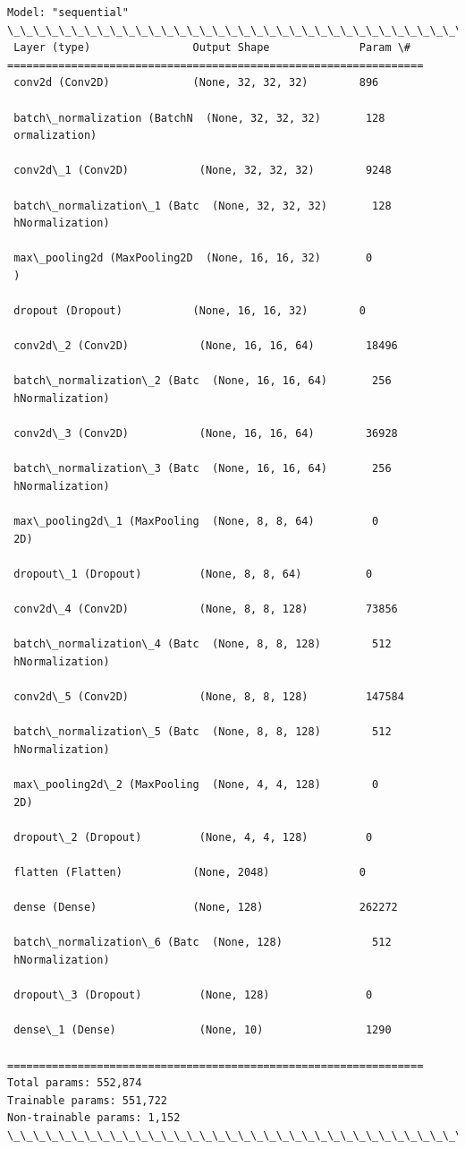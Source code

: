 \documentclass[11pt]{article}
\begin{document}
    \begin{Verbatim}[commandchars=\\\{\}]
Model: "sequential"
\_\_\_\_\_\_\_\_\_\_\_\_\_\_\_\_\_\_\_\_\_\_\_\_\_\_\_\_\_\_\_\_\_\_\_\_\_\_\_\_\_\_\_\_\_\_\_\_\_\_\_\_\_\_\_\_\_\_\_\_\_\_\_\_\_
 Layer (type)                Output Shape              Param \#
=================================================================
 conv2d (Conv2D)             (None, 32, 32, 32)        896

 batch\_normalization (BatchN  (None, 32, 32, 32)       128
 ormalization)

 conv2d\_1 (Conv2D)           (None, 32, 32, 32)        9248

 batch\_normalization\_1 (Batc  (None, 32, 32, 32)       128
 hNormalization)

 max\_pooling2d (MaxPooling2D  (None, 16, 16, 32)       0
 )

 dropout (Dropout)           (None, 16, 16, 32)        0

 conv2d\_2 (Conv2D)           (None, 16, 16, 64)        18496

 batch\_normalization\_2 (Batc  (None, 16, 16, 64)       256
 hNormalization)

 conv2d\_3 (Conv2D)           (None, 16, 16, 64)        36928

 batch\_normalization\_3 (Batc  (None, 16, 16, 64)       256
 hNormalization)

 max\_pooling2d\_1 (MaxPooling  (None, 8, 8, 64)         0
 2D)

 dropout\_1 (Dropout)         (None, 8, 8, 64)          0

 conv2d\_4 (Conv2D)           (None, 8, 8, 128)         73856

 batch\_normalization\_4 (Batc  (None, 8, 8, 128)        512
 hNormalization)

 conv2d\_5 (Conv2D)           (None, 8, 8, 128)         147584

 batch\_normalization\_5 (Batc  (None, 8, 8, 128)        512
 hNormalization)

 max\_pooling2d\_2 (MaxPooling  (None, 4, 4, 128)        0
 2D)

 dropout\_2 (Dropout)         (None, 4, 4, 128)         0

 flatten (Flatten)           (None, 2048)              0

 dense (Dense)               (None, 128)               262272

 batch\_normalization\_6 (Batc  (None, 128)              512
 hNormalization)

 dropout\_3 (Dropout)         (None, 128)               0

 dense\_1 (Dense)             (None, 10)                1290

=================================================================
Total params: 552,874
Trainable params: 551,722
Non-trainable params: 1,152
\_\_\_\_\_\_\_\_\_\_\_\_\_\_\_\_\_\_\_\_\_\_\_\_\_\_\_\_\_\_\_\_\_\_\_\_\_\_\_\_\_\_\_\_\_\_\_\_\_\_\_\_\_\_\_\_\_\_\_\_\_\_\_\_\_
    \end{Verbatim}
\end{document}
